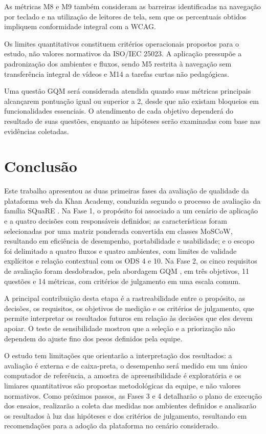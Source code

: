 \documentclass[sigconf, language=english, language=brazilian,natbib=false]{acmart}
\begin{document}
As métricas M8 e M9 também consideram as barreiras
identificadas na navegação por teclado e na utilização
de leitores de tela, sem que os percentuais obtidos
impliquem conformidade integral com a WCAG.

Os limites quantitativos constituem critérios
operacionais propostos para o estudo, não valores
normativos da ISO/IEC 25023. A aplicação pressupõe
a padronização dos ambientes e fluxos, sendo M5
restrita à navegação sem transferência integral
de vídeos e M14 a tarefas curtas não pedagógicas.

Uma questão GQM será considerada atendida quando
suas métricas principais alcançarem pontuação igual
ou superior a 2, desde que não existam bloqueios
em funcionalidades essenciais. O atendimento de
cada objetivo dependerá do resultado de suas
questões, enquanto as hipóteses serão examinadas
com base nas evidências coletadas.

\section{Conclusão}

Este trabalho apresentou as duas primeiras fases da avaliação de qualidade da plataforma web da Khan Academy, conduzida segundo o processo de avaliação da família SQuaRE \cite{iso25040}. Na Fase 1, o propósito foi associado a um cenário de aplicação e a quatro decisões com responsáveis definidos; as características foram selecionadas por uma matriz ponderada convertida em classes MoSCoW, resultando em eficiência de desempenho, portabilidade e usabilidade; e o escopo foi delimitado a quatro fluxos e quatro ambientes, com limites de validade explícitos e relação contextual com os ODS 4 e 10. Na Fase 2, os cinco requisitos de avaliação foram desdobrados, pela abordagem GQM \cite{basili1994goal}, em três objetivos, 11 questões e 14 métricas, com critérios de julgamento em uma escala comum.

A principal contribuição desta etapa é a rastreabilidade entre o propósito, as decisões, os requisitos, os objetivos de medição e os critérios de julgamento, que permite interpretar os resultados futuros em relação às decisões que eles devem apoiar. O teste de sensibilidade mostrou que a seleção e a priorização não dependem do ajuste fino dos pesos definidos pela equipe.

O estudo tem limitações que orientarão a interpretação dos resultados: a avaliação é externa e de caixa-preta, o desempenho será medido em um único computador de referência, a amostra de apreensibilidade é exploratória e os limiares quantitativos são propostas metodológicas da equipe, e não valores normativos. Como próximos passos, as Fases 3 e 4 detalharão o plano de execução dos ensaios, realizarão a coleta das medidas nos ambientes definidos e analisarão os resultados à luz das hipóteses e dos critérios de julgamento, resultando em recomendações para a adoção da plataforma no cenário considerado.
\end{document}
